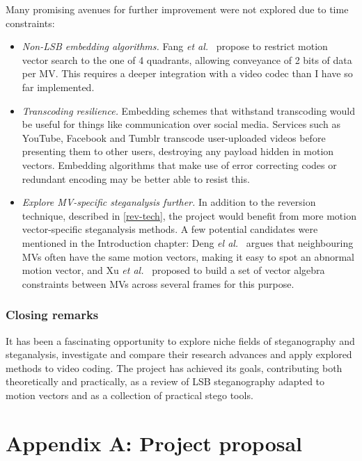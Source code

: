 \documentclass[12pt,british,twoside,notitlepage,usenames,dvipsnames,hypens,final]{report}
\numberwithin{equation}{section}
\numberwithin{figure}{section}
\begin{document}
Many promising avenues for further improvement were not explored due to time constraints:
\begin{itemize}
\item \textit{Non-LSB embedding algorithms.} Fang \emph{et al.}~\cite{fang2006data} propose to restrict motion vector search to the one of 4 quadrants, allowing conveyance of 2 bits of data per MV. This requires a deeper integration with a video codec than I have so far implemented.
\item \textit{Transcoding resilience.} Embedding schemes that withstand transcoding would be useful for things like communication over social media. Services such as YouTube, Facebook and Tumblr transcode user-uploaded videos before presenting them to other users, destroying any payload hidden in motion vectors. Embedding algorithms that make use of error correcting codes or redundant encoding may be better able to resist this.
\item \textit{Explore MV-specific steganalysis further.} In addition to the reversion technique, described in \ref{rev-tech}, the project would benefit from more motion vector-specific steganalysis methods. A few potential candidates were mentioned in the Introduction chapter: Deng \emph{el al.}~\cite{deng2012digital} argues that neighbouring MVs often have the same motion vectors, making it easy to spot an abnormal motion vector, and Xu \emph{et al.}~\cite{xu2013video} proposed to build a set of vector algebra constraints between MVs across several frames for this purpose.
\end{itemize}

\subsection*{Closing remarks}

It has been a fascinating opportunity to explore niche fields of steganography and steganalysis, investigate and compare their research advances and apply explored methods to video coding. The project has achieved its goals, contributing both theoretically and practically, as a review of LSB steganography adapted to motion vectors and as a collection of practical stego tools.

\cleardoublepage



\appendix
\cleardoublepage
{}
\chapter*{Appendix A: Project proposal}


\end{document}
